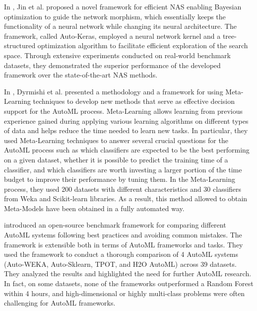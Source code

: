 In \cite{Jin2019}, Jin et al. proposed a novel framework for efficient NAS enabling Bayesian optimization to guide the network morphism, which essentially keeps the functionality of a neural network while changing its neural architecture.
The framework, called Auto-Keras, employed a neural network kernel and a tree-structured optimization algorithm to facilitate efficient exploration of the search space.
Through extensive experiments conducted on real-world benchmark datasets, they demonstrated the superior performance of the developed framework over the state-of-the-art NAS methods.

In \cite{8955514}, Dyrmishi et al. presented a methodology and a framework for using Meta-Learning techniques to develop new methods that serve as effective decision support for the AutoML process.
Meta-Learning allows learning from previous experience gained during applying various learning algorithms on different types of data and helps reduce the time needed to learn new tasks.
In particular, they used Meta-Learning techniques to answer several crucial questions for the AutoML process such as which classifiers are expected to be the best performing on a given dataset, whether it is possible to predict the training time of a classifier, and which classifiers are worth investing a larger portion of the time budget to improve their performance by tuning them.
In the Meta-Learning process, they used 200 datasets with different characteristics and 30 classifiers from Weka and Scikit-learn libraries.
As a result, this method allowed to obtain Meta-Models have been obtained in a fully automated way.

\cite{Gijsbers2019} introduced an open-source benchmark framework for comparing different AutoML systems following best practices and avoiding common mistakes.
The framework is extensible both in terms of AutoML frameworks and tasks.
They used the framework to conduct a thorough comparison of 4 AutoML systems (Auto-WEKA, Auto-Sklearn, TPOT, and H2O AutoML) across 39 datasets.
They analyzed the results and highlighted the need for further AutoML research.
In fact, on some datasets, none of the frameworks outperformed a Random Forest within 4 hours, and high-dimensional or highly multi-class problems were often challenging for AutoML frameworks.

